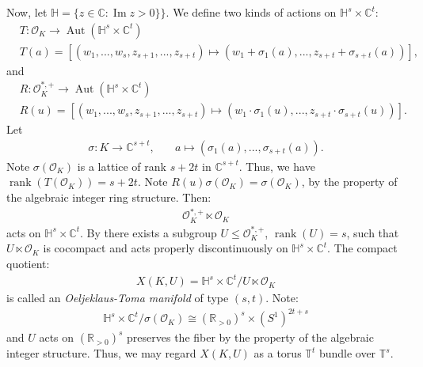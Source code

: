\documentclass[12pt]{amsart}
\numberwithin{equation}{section}
\numberwithin{prop}{section}
\theoremstyle{definition}
\begin{document}
    Now, let $\mathbb{H}=\{z\in\mathbb{C}:\operatorname{Im} z >0\}\}$.  We define two kinds of actions on $\mathbb{H}^s\times \mathbb{C}^t$:
    \begin{align*}
        &T: \mathcal{O}_K \to \operatorname{Aut}(\mathbb{H}^s\times \mathbb{C}^t)\\
        &T(a)=[(w_1,...,w_s,z_{s+1},...,z_{s+t})\mapsto (w_1+\sigma_1(a),...,z_{s+t}+\sigma_{s+t}(a))],
    \end{align*}
    and
    \begin{align*}
        &R:\mathcal{O}_K^{*,+}\to \operatorname{Aut}(\mathbb{H}^s\times \mathbb{C}^t)\\
        &R(u)=[(w_1, ..., w_s, z_{s+1}, ..., z_{s+t})\mapsto (w_1\cdot\sigma_1(u),...,z_{s+t}\cdot\sigma_{s+t}(u))].
    \end{align*}
    Let
    \begin{align*}
        \sigma : K \to \mathbb{C}^{s+t}, \quad 
        & a\mapsto (\sigma_1(a), ..., \sigma_{s+t}(a)).
    \end{align*}
    Note $\sigma(\mathcal{O}_K)$ is a lattice of rank $s+2t$ in $\mathbb{C}^{s+t}$. Thus, we have $\operatorname{rank}(T(\mathcal{O}_K))=s+2t$. Note $R(u)\sigma(\mathcal{O}_K) = \sigma(\mathcal{O}_K)$, by the property of the algebraic integer ring structure. Then:
    \begin{align*}
        \mathcal{O}_K^{*,+}\ltimes \mathcal{O}_K
    \end{align*}
    acts on $\mathbb{H}^s\times \mathbb{C}^t$.  By \cite{oeljeklaus2005non} there exists a subgroup $U\leq \mathcal{O}_K^{*,+}$, $\operatorname{rank}(U)=s$, such that  $U\ltimes \mathcal{O}_K$ is cocompact and acts properly discontinuously on $\mathbb{H}^s\times \mathbb{C}^t$.  The compact quotient:
    \begin{align*}
        X(K,U)=\mathbb{H}^s\times \mathbb{C}^t/U\ltimes \mathcal{O}_K
    \end{align*}
    is called an \textit{Oeljeklaus-Toma manifold} of type $(s,t)$. Note:
    \begin{align*}
        \mathbb{H}^s\times\mathbb{C}^t/\sigma(\mathcal{O}_K)    \cong (\mathbb{R}_{>0})^s\times(S^1)^{ 2t+s}
    \end{align*}
    and $U$ acts on $(\mathbb{R}_{> 0})^s$ preserves the fiber by the property of the algebraic integer structure. Thus, we may regard $X(K,U)$ as a torus $\mathbb{T}^t$ bundle over $\mathbb{T}^s$.
\end{document}
